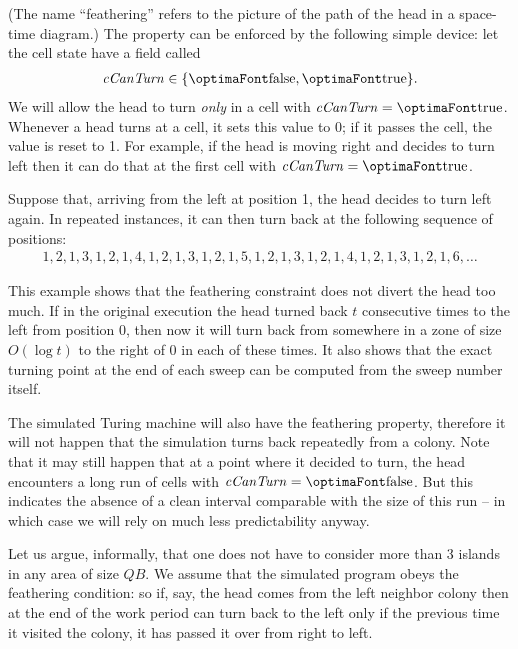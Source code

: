\documentclass[12pt]{memoir}
\newcommand{\fld}[1]{\ensuremath{\textit{#1\/}}}
\def\B{B}
\newcommand{\cCanTurn}{\fld{cCanTurn}}
\begin{document}
(The name ``feathering'' refers to the picture of the path of the head in a space-time diagram.)
The property can be enforced by the following simple
device: let the cell state have a field called
\begin{align*}
   \cCanTurn\in\{ \false,\true \}.
 \end{align*}
We will allow the head to turn \emph{only} in a cell with \( \cCanTurn=\true \).
Whenever a head turns at a cell, it sets this value to 0; if  it passes the cell, the value 
is reset to 1.
For example, if the head is moving right and decides to turn left then
it can do that at the first cell with \( \cCanTurn=\true \).

\begin{example}[Feathering]\label{xmp:feathering}
Suppose that, arriving from the left at position 1, the head decides to turn left again.
In repeated instances, it can then turn back at the following sequence of positions:
\begin{align*}
 1, 2, 1, 3, 1, 2, 1, 4, 1, 2, 1, 3, 1, 2, 1, 5, 1, 2, 1, 3, 1, 2, 1, 4, 1, 2, 1, 3, 1, 2, 1, 6, \dots
 \end{align*}
\end{example}

This example shows that the feathering constraint does not divert the head
too much.
If in the original execution the head turned back \( t \) consecutive
times to the left from position 0, then now it will 
turn back from somewhere in a zone of size \( O(\log t) \) to the right of 0 in 
each of these times.
It also shows that the exact turning point at the end of each sweep
can be computed from the sweep number itself.

The simulated Turing machine will also have the feathering property,
therefore it will not happen that the simulation turns back repeatedly from a colony.
Note that it may still happen that at a point where it decided to turn, 
the head encounters a long run of cells with \( \cCanTurn=\false \).
But this indicates the absence of a clean interval comparable with the size of this 
run -- in which case we will rely on much less predictability anyway.

Let us argue, informally, that one does 
not have to consider more than 3 islands in any area of size \( Q\B \).
We assume that the simulated program obeys the
feathering condition: so if, say, the head comes from the left neighbor colony
then at the end of the work period can turn back to the left only if 
the previous time it visited the colony, it has passed it over from right to left.
\end{document}
